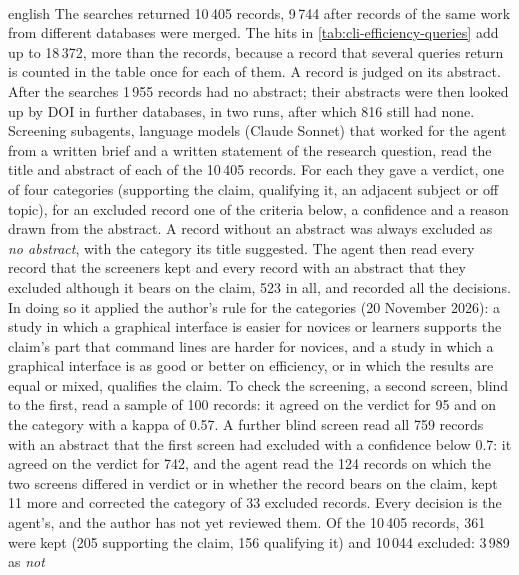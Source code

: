 \paragraph{} %
\begin{onlyin}{english} %
The searches returned 10\,405 records, 9\,744 after records of the same
work from different databases were merged.  The hits in
\cref{tab:cli-efficiency-queries} add up to 18\,372, more than the
records, because a record that several queries return is counted in the
table once for each of them.  A record is judged on its abstract.
After the searches 1\,955 records had no abstract; their abstracts were
then looked up by DOI in further databases, in two runs, after which
816 still had none.  Screening subagents, language models (Claude Sonnet) that
worked
for the agent from a written brief and a written statement of the
research question, read the title and abstract of each of the
10\,405 records.  For each they gave a verdict, one of four categories
(supporting the claim, qualifying it, an adjacent subject or off topic),
for an excluded record one of the criteria below, a confidence and a
reason drawn from the abstract.  A record without an abstract was always
excluded as \emph{no abstract}, with the category its title suggested.
The agent then read every record that the screeners kept and every
record with an abstract that they excluded although it bears on the
claim, 523 in all, and recorded all the decisions.  In doing so it applied the
author's rule for the categories (20 November 2026): a study in which a
graphical interface is easier for novices or learners supports the
claim's part that command lines are harder for novices, and a study in
which a graphical interface is as good or better on efficiency, or in
which the results are equal or mixed, qualifies the claim.  To check the
screening, a second screen, blind to the first, read a sample of 100
records: it agreed on the verdict for 95 and on the category with a
kappa of 0.57.  A further blind screen read all 759 records with an
abstract that the first screen had excluded with a confidence below 0.7:
it agreed on the verdict for 742, and the agent read the 124 records on
which the two screens differed in verdict or in whether the record bears
on the claim, kept 11 more and corrected the category of 33 excluded
records.  Every decision is the agent's, and the author has not yet
reviewed them.  Of the 10\,405 records, 361 were kept (205 supporting
the claim, 156 qualifying it) and 10\,044 excluded: 3\,989 as \emph{not
}
\end{onlyin}
